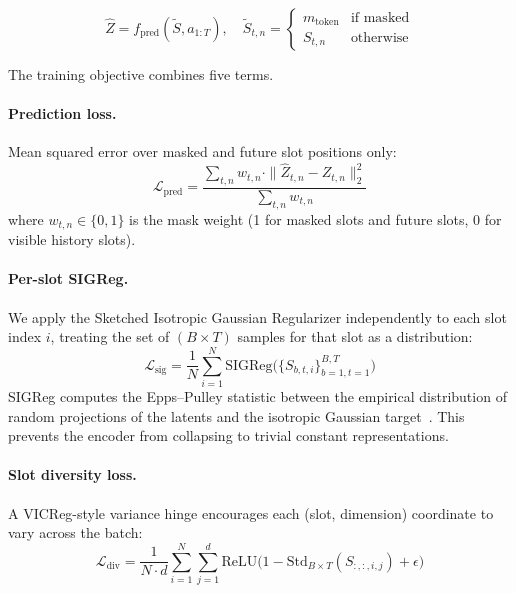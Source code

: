 \documentclass[12pt]{article}
\begin{document}
\begin{equation}
\hat{Z} = f_{\text{pred}}(\tilde{S}, a_{1:T}), \quad
\tilde{S}_{t,n} = \begin{cases}
m_{\text{token}} & \text{if masked}\\
S_{t,n} & \text{otherwise}
\end{cases}
\end{equation}

The training objective combines five terms.

\paragraph{Prediction loss.} Mean squared error over masked and future slot positions only:
\begin{equation}
\mathcal{L}_{\text{pred}} = \frac{\sum_{t,n} w_{t,n} \cdot \|\hat{Z}_{t,n} - Z_{t,n}\|_2^2}{\sum_{t,n} w_{t,n}}
\end{equation}
where $w_{t,n} \in \{0,1\}$ is the mask weight (1 for masked slots and future slots, 0 for visible history slots).

\paragraph{Per-slot SIGReg.} We apply the Sketched Isotropic Gaussian Regularizer independently to each slot index $i$, treating the set of $(B \times T)$ samples for that slot as a distribution:
\begin{equation}
\mathcal{L}_{\text{sig}} = \frac{1}{N}\sum_{i=1}^{N} \text{SIGReg}\big(\{S_{b,t,i}\}_{b=1,t=1}^{B,T}\big)
\end{equation}
SIGReg computes the Epps--Pulley statistic between the empirical distribution of random projections of the latents and the isotropic Gaussian target~\citep{maes2026lewm}. This prevents the encoder from collapsing to trivial constant representations.

\paragraph{Slot diversity loss.} A VICReg-style variance hinge encourages each (slot, dimension) coordinate to vary across the batch:
\begin{equation}
\mathcal{L}_{\text{div}} = \frac{1}{N \cdot d} \sum_{i=1}^{N} \sum_{j=1}^{d} \text{ReLU}\big(1 - \text{Std}_{B \times T}(S_{:,:,i,j}) + \epsilon\big)
\end{equation}
\end{document}
